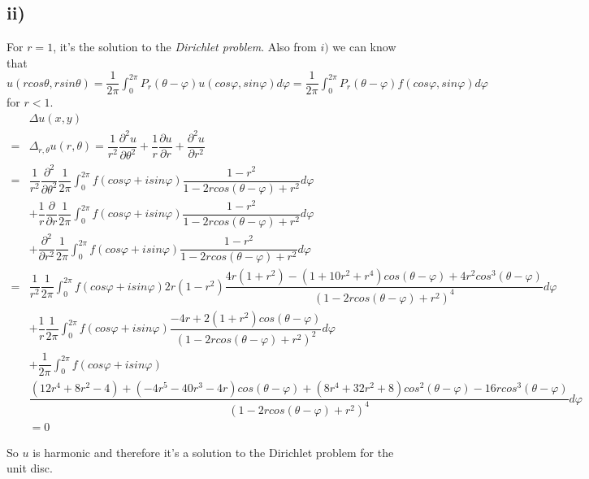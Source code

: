 \documentclass[a4paper,12pt,titlepage]{article}
\begin{document}
\subsection*{ii)}
For $r=1$, it's the solution to the \textit{Dirichlet problem}. Also from $i)$ we can know that 
$u(rcos\theta,rsin\theta)=\dfrac{1}{2\pi}\int_{0}^{2\pi}P_r(\theta-\varphi)u(cos\varphi,sin\varphi) d\varphi=\dfrac{1}{2\pi}\int_{0}^{2\pi}P_r(\theta-\varphi)f(cos\varphi,sin\varphi) d\varphi$ for $r<1$.
\begin{align*}
&\Delta u(x,y)\\=&\Delta_{r,\theta}u(r,\theta)=\dfrac{1}{r^2}\dfrac{\partial^2 u}{\partial \theta^2}+\dfrac{1}{r}\dfrac{\partial u}{\partial r}+\dfrac{\partial^2 u}{\partial r^2}\\
=&\dfrac{1}{r^2}\dfrac{\partial^2 }{\partial \theta^2}\dfrac{1}{2\pi}\int_{0}^{2\pi}f(cos\varphi+isin\varphi)\dfrac{1-r^2}{1-2rcos(\theta-\varphi)+r^2} d\varphi\\
&+\dfrac{1}{r}\dfrac{\partial }{\partial r}\dfrac{1}{2\pi}\int_{0}^{2\pi}f(cos\varphi+isin\varphi)\dfrac{1-r^2}{1-2rcos(\theta-\varphi)+r^2} d\varphi\\
&+\dfrac{\partial^2 }{\partial r^2}\dfrac{1}{2\pi}\int_{0}^{2\pi}f(cos\varphi+isin\varphi)\dfrac{1-r^2}{1-2rcos(\theta-\varphi)+r^2} d\varphi\\
=&\dfrac{1}{r^2}\dfrac{1}{2\pi}\int_{0}^{2\pi}f(cos\varphi+isin\varphi)2r(1-r^2)\dfrac{4r(1+r^2)-(1+10r^2+r^4)cos(\theta-\varphi)+4r^2cos^3(\theta-\varphi)}{(1-2rcos(\theta-\varphi)+r^2)^4} d\varphi\\
&+\dfrac{1}{r}\dfrac{1}{2\pi}\int_{0}^{2\pi}f(cos\varphi+isin\varphi)\dfrac{-4r+2(1+r^2)cos(\theta-\varphi)}{(1-2rcos(\theta-\varphi)+r^2)^2} d\varphi\\
&+\dfrac{1}{2\pi}\int_{0}^{2\pi}f(cos\varphi+isin\varphi)\\&\dfrac{(12r^4+8r^2-4)+(-4r^5-40r^3-4r)cos(\theta-\varphi)+(8r^4+32r^2+8)cos^2(\theta-\varphi)-16rcos^3(\theta-\varphi)}{(1-2rcos(\theta-\varphi)+r^2)^4} d\varphi\\
&=0
\end{align*}

So $u$ is harmonic and therefore it's a solution to the Dirichlet problem for the unit disc.
\end{document}
